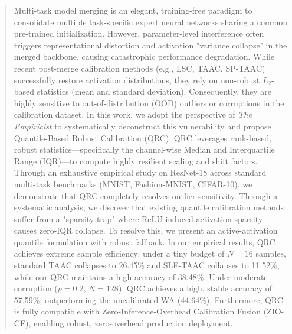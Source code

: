\documentclass{article}
\theoremstyle{plain}
\theoremstyle{definition}
\theoremstyle{remark}
\begin{document}

\printAffiliationsAndNotice{}

\begin{abstract}
  Multi-task model merging is an elegant, training-free paradigm to consolidate multiple task-specific expert neural networks sharing a common pre-trained initialization. However, parameter-level interference often triggers representational distortion and activation "variance collapse" in the merged backbone, causing catastrophic performance degradation. While recent post-merge calibration methods (e.g., LSC, TAAC, SP-TAAC) successfully restore activation distributions, they rely on non-robust $L_2$-based statistics (mean and standard deviation). Consequently, they are highly sensitive to out-of-distribution (OOD) outliers or corruptions in the calibration dataset. In this work, we adopt the perspective of \textit{The Empiricist} to systematically deconstruct this vulnerability and propose Quantile-Based Robust Calibration (QRC). QRC leverages rank-based, robust statistics---specifically the channel-wise Median and Interquartile Range (IQR)---to compute highly resilient scaling and shift factors. Through an exhaustive empirical study on ResNet-18 across standard multi-task benchmarks (MNIST, Fashion-MNIST, CIFAR-10), we demonstrate that QRC completely resolves outlier sensitivity. Through a systematic analysis, we discover that existing quantile calibration methods suffer from a "sparsity trap" where ReLU-induced activation sparsity causes zero-IQR collapse. To resolve this, we present an active-activation quantile formulation with robust fallback. In our empirical results, QRC achieves extreme sample efficiency: under a tiny budget of $N=16$ samples, standard TAAC collapses to 26.45\% and SLF-TAAC collapses to 11.52\%, while our QRC maintains a high accuracy of 38.48\%. Under moderate corruption ($p=0.2$, $N=128$), QRC achieves a high, stable accuracy of 57.59\%, outperforming the uncalibrated WA (44.64\%). Furthermore, QRC is fully compatible with Zero-Inference-Overhead Calibration Fusion (ZIO-CF), enabling robust, zero-overhead production deployment.
\end{abstract}
\end{document}
